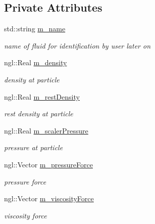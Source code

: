 \subsection*{Private Attributes}
\begin{DoxyCompactItemize}
\item 
std::string \hyperlink{class_fluid_particle_a58aafd3376c4f7504b4b6a045d3b693e}{m\_\-name}
\begin{DoxyCompactList}\small\item\em name of fluid for identification by user later on \item\end{DoxyCompactList}\item 
ngl::Real \hyperlink{class_fluid_particle_ad2c0d1dae5fc90f4bbdce3ea51c6fb71}{m\_\-density}
\begin{DoxyCompactList}\small\item\em density at particle \item\end{DoxyCompactList}\item 
ngl::Real \hyperlink{class_fluid_particle_aa8e7cedce80b89676c3c4ddba1e163f3}{m\_\-restDensity}
\begin{DoxyCompactList}\small\item\em rest density at particle \item\end{DoxyCompactList}\item 
ngl::Real \hyperlink{class_fluid_particle_a3b5d86db4ec613904adcac9e55c15e38}{m\_\-scalerPressure}
\begin{DoxyCompactList}\small\item\em pressure at particle \item\end{DoxyCompactList}\item 
ngl::Vector \hyperlink{class_fluid_particle_a0fc3f13aa67912329489ec7f3550af13}{m\_\-pressureForce}
\begin{DoxyCompactList}\small\item\em pressure force \item\end{DoxyCompactList}\item 
ngl::Vector \hyperlink{class_fluid_particle_a2118d5719ce2331efb1f3bc7c0650cfa}{m\_\-viscosityForce}
\begin{DoxyCompactList}\small\item\em viscosity force \item\end{DoxyCompactList}\item 

\end{DoxyCompactItemize}

